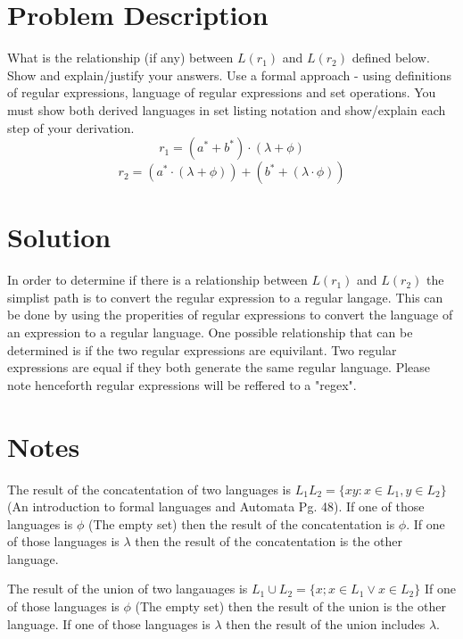 \documentclass{assignment-x}
\begin{document}
\maketitle
\pagebreak

\section{Problem Description}
What is the relationship (if any) between $L(r_1)$ and $L(r_2)$ defined below. Show and explain/justify your answers. Use a formal approach - using definitions of regular expressions, language of regular expressions and set operations. You must show both derived languages in set listing notation and show/explain each step of your derivation.
$$r_1 = (a^*+b^*)\cdot(\lambda + \phi)$$
$$r_2 = (a^* \cdot (\lambda + \phi))+ (b^* + (\lambda \cdot \phi))$$

\section{Solution}
In order to determine if there is a relationship between $L(r_1)$ and $L(r_2)$ the simplist path is to convert the regular expression to a regular langage. This can be done by using the properities of regular expressions to convert the language of an expression to a regular language. One possible relationship that can be determined is if the two regular expressions are equivilant. Two regular expressions are equal if they both generate the same regular language. Please note henceforth regular expressions will be reffered to a "regex".

\section{Notes}
The result of the concatentation of two languages is $L_1L_2=\{xy: x \in L_1, y \in L_2\}$ (An introduction to formal languages and Automata Pg. 48). 
If one of those languages is $\phi$ (The empty set) then the result of the concatentation is $\phi$.
If one of those languages is ${\lambda}$ then the result of the concatentation is the other language. 

The result of the union of two langauages is $L_1 \cup L_2  = \{x; x\in L_1 \lor x \in L_2\}$
If one of those languages is $\phi$ (The empty set) then the result of the union is the other language.
If one of those languages is ${\lambda}$ then the result of the union includes $\lambda$. 
\end{document}
